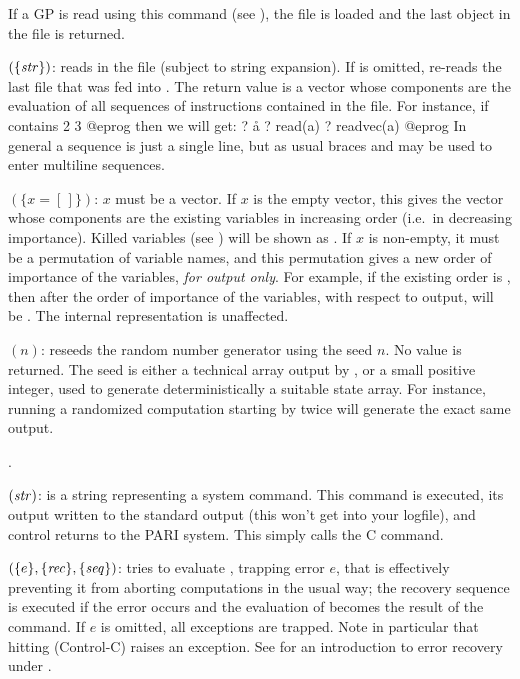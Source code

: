 If a GP  is read using this command (see
), the file is loaded and the last object in the file
is returned.

$(\{\hbox{\it str\/}\})$:  reads in the file
 (subject to string expansion). If  is
omitted, re-reads the last file that was fed into . The return
value is a vector whose components are the evaluation of all sequences
of instructions contained in the file. For instance, if  contains
  2
  3
@eprog\noindent
then we will get:
\bprog
  ? \r a
  ? read(a)
  ? readvec(a)
@eprog
In general a sequence is just a single line, but as usual braces and
\kbd{\bs\bs} may be used to enter multiline sequences.

$(\{x=[\,]\})$: $x$ must be a vector. If $x$ is the
empty vector, this gives the vector whose components are the existing
variables in increasing order (i.e.~in decreasing importance). Killed
variables (see ) will be shown as . If $x$ is
non-empty, it must be a permutation of variable names, and this permutation
gives a new order of importance of the variables, \emph{for output only}. For
example, if the existing order is \kbd{[x,y,z]}, then after
 the order of importance of the variables, with respect
to output, will be \kbd{[z,y,x]}. The internal representation is unaffected.
\label{se:reorder}

$(n)$: reseeds the random number generator using the
seed $n$. No value is returned. The seed is either a technical array output
by , or a small positive integer, used to generate
deterministically a suitable state array. For instance, running a randomized
computation starting by  twice will generate the exact same
output.

.

$(\hbox{\it str\/})$:  is a string representing
a system command. This command is executed, its output written to the
standard output (this won't get into your logfile), and control returns
to the PARI system. This simply calls the C  command.

$(\{e\}, \{\hbox{\it rec\/}\}, \{\hbox{\it seq\/}\})$: tries to
evaluate , trapping error $e$, that is effectively preventing it
from aborting computations in the usual way; the recovery sequence
 is executed if the error occurs and the evaluation of 
becomes the result of the command. If $e$ is omitted, all exceptions are
trapped. Note in particular that hitting  (Control-C) raises an
exception. See  for an introduction to error recovery
under .

